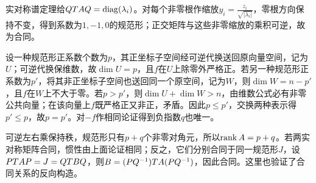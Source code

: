 \label{der:6-1}
实对称谱定理给$QT AQ=\operatorname{diag}(\lambda_i)$。对每个非零根作缩放$y_i=\frac{z_i}{\sqrt{|\lambda_i|}}$，零根方向保持不变，得到系数为$1,-1,0$的规范形；正交矩阵与这些非零缩放的乘积可逆，故为合同。

设一种规范形正系数个数为$p$，其正坐标子空间经可逆代换送回原向量空间，记为$U$；可逆代换保维数，故$\dim U=p$，且$f$在$U$上除零外严格正。若另一种规范形正系数为$p'$，将其非正坐标子空间也送回同一个原空间，记为$W$，则$\dim W=n-p'$，且$f$在$W$上不大于零。若$p>p'$，则$\dim U+\dim W>n$，由维数公式必有非零公共向量；在该向量上$f$既严格正又非正，矛盾。因此$p\le p'$，交换两种表示得$p'\le p$，故$p=p'$。对$-f$作相同论证得到负指数$q$也唯一。

可逆左右乘保持秩，规范形只有$p+q$个非零对角元，所以$\operatorname{rank} A=p+q$。若两实对称矩阵合同，惯性由上面论证相同；反之，它们分别合同于同一规范形$J$，设$PT AP=J=QT BQ$，则$B=(PQ^{-1})T A(PQ^{-1})$，因此合同。这里也验证了合同关系的反向构造。

